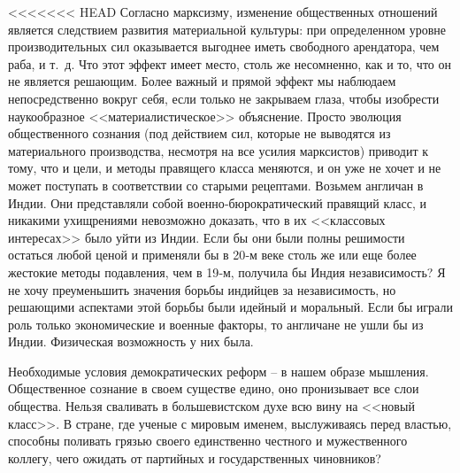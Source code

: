 \documentclass{book}
\begin{document}
<<<<<<< HEAD
Согласно марксизму, изменение общественных отношений является следствием развития материальной культуры: при определенном уровне производительных сил оказывается выгоднее иметь свободного арендатора, чем раба, и т.~д. Что этот эффект имеет место, столь же несомненно, как и то, что он не является решающим. Более важный и прямой эффект мы наблюдаем непосредственно вокруг себя, если только не закрываем глаза, чтобы изобрести наукообразное <<материалистическое>> объяснение. Просто эволюция общественного сознания (под действием сил, которые не выводятся из материального производства, несмотря на все усилия марксистов) приводит к тому, что и цели, и методы правящего класса меняются, и он уже не хочет и не может поступать в соответствии со ста­рыми рецептами. Возьмем англичан в Индии. Они представля­ли собой военно‑бюрократический правящий класс, и никаки­ми ухищрениями невозможно доказать, что в их <<классовых интересах>> было уйти из Индии. Если бы они были полны реши­мости остаться любой ценой и применяли бы в 20‑м веке столь же или еще более жестокие методы подавления, чем в 19‑м, получила бы Индия независимость? Я не хочу преуменьшить значения борьбы индийцев за независимость, но решающими ас­пектами этой борьбы были идейный и моральный. Если бы играли роль только экономические и военные факторы, то англичане не ушли бы из Индии. Физическая возможность у них была.

Необходимые условия демократических реформ -- в нашем образе мышления. Общественное сознание в своем существе едино, оно пронизывает все слои общества. Нельзя сваливать в большевистском духе всю вину на <<новый класс>>. В стране, где ученые с мировым именем, выслуживаясь перед властью, способны поливать грязью своего единственно честного и мужественного коллегу, чего ожидать от партийных и государственных чиновников?
\end{document}
